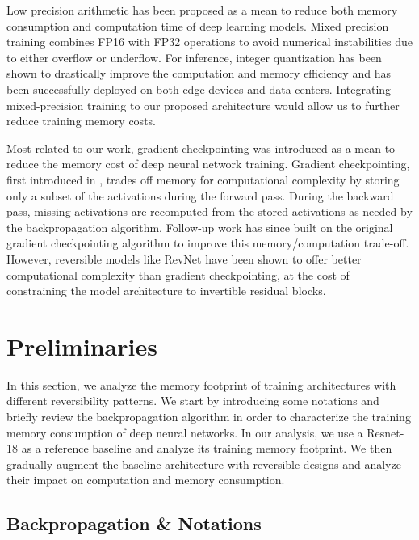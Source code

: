 \documentclass[twocolumn]{bmcart}
\begin{document}
Low precision arithmetic has been proposed as a mean to reduce both memory consumption and computation time of deep learning models. Mixed precision training \cite{micikevicius2017mixed} combines FP16 with FP32 operations to avoid numerical instabilities due to either overflow or underflow.
For inference, integer quantization \cite{jacob2018quantization,wu2018training} has been shown to drastically improve the computation and memory efficiency and has been successfully deployed on both edge devices and data centers.
Integrating mixed-precision training to our proposed architecture would allow us to further reduce training memory costs.

Most related to our work, gradient checkpointing was introduced as a mean to reduce the memory cost of deep neural network training.
Gradient checkpointing, first introduced in \cite{martens2012training}, trades off memory for computational complexity by storing only a subset of the activations during the forward pass.
During the backward pass, missing activations are recomputed from the stored activations as needed by the backpropagation algorithm.
Follow-up work \cite{chen2016training} has since built on the original gradient checkpointing algorithm to improve this memory/computation trade-off.
However, reversible models like RevNet have been shown to offer better computational complexity than gradient checkpointing,
at the cost of constraining the model architecture to invertible residual blocks.

\section{Preliminaries}

In this section, we analyze the memory footprint of training architectures with different reversibility patterns.
We start by introducing some notations and briefly review the backpropagation algorithm
in order to characterize the training memory consumption of deep neural networks.
In our analysis, we use a Resnet-18 as a reference baseline and analyze its training memory footprint.
We then gradually augment the baseline architecture with reversible designs and analyze their impact on computation and memory consumption.

\subsection{Backpropagation \& Notations}
\end{document}

